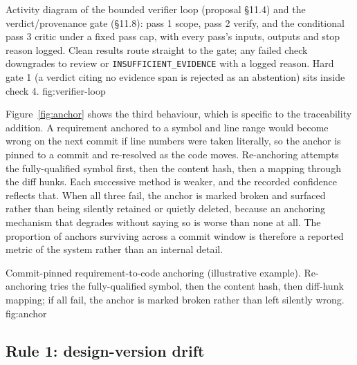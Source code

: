 \lsfigure{}
  {Activity diagram of the bounded verifier loop (proposal §11.4)
           and the verdict/provenance gate (§11.8): pass 1 scope, pass 2
           verify, and the conditional pass 3 critic under a fixed pass cap,
           with every pass's inputs, outputs and stop reason logged. Clean
           results route straight to the gate; any failed check downgrades
           to review or \texttt{INSUFFICIENT\_EVIDENCE} with a logged reason.
           Hard gate 1 (a verdict citing no evidence span is rejected as an
           abstention) sits inside check 4.}
  {fig:verifier-loop}

Figure~\ref{fig:anchor} shows the third behaviour, which is specific to the
traceability addition. A requirement anchored to a symbol and line range would
become wrong on the next commit if line numbers were taken literally, so the
anchor is pinned to a commit and re-resolved as the code moves. Re-anchoring
attempts the fully-qualified symbol first, then the content hash, then a mapping
through the diff hunks. Each successive method is weaker, and the recorded
confidence reflects that. When all three fail, the anchor is marked broken and
surfaced rather than being silently retained or quietly deleted, because an
anchoring mechanism that degrades without saying so is worse than none at all.
The proportion of anchors surviving across a commit window is therefore a
reported metric of the system rather than an internal detail.

\lsfigure{}
  {Commit-pinned requirement-to-code anchoring (illustrative example).
           Re-anchoring tries the fully-qualified symbol, then the content hash,
           then diff-hunk mapping; if all fail, the anchor is marked broken
           rather than left silently wrong.}
  {fig:anchor}

\subsection*{Rule 1: design-version drift}

